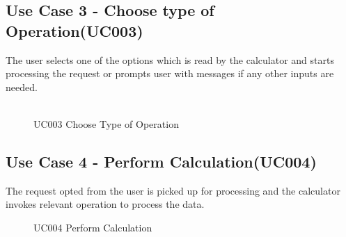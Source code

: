\documentclass[12pt, a4paper]{report}
\begin{document}
\subsection{Use Case 3 - Choose type of Operation(UC003)}
\quad The user selects one of the options which is read by the calculator and starts processing the request or prompts user with messages if any other inputs are needed.\\\\
\begin{figure}[h]
    \centering
    \caption{UC003 Choose Type of Operation}
    \label{fig:UC003 Choose Type of Operation}
\end{figure}

\subsection{Use Case 4 - Perform Calculation(UC004)}
\quad The request opted from the user is picked up for processing and the calculator invokes relevant operation to process the data.
\begin{figure}[h]
    \centering
    \caption{UC004 Perform Calculation}
    \label{fig:UC004 Perform Calculation}
\end{figure}
\end{document}
